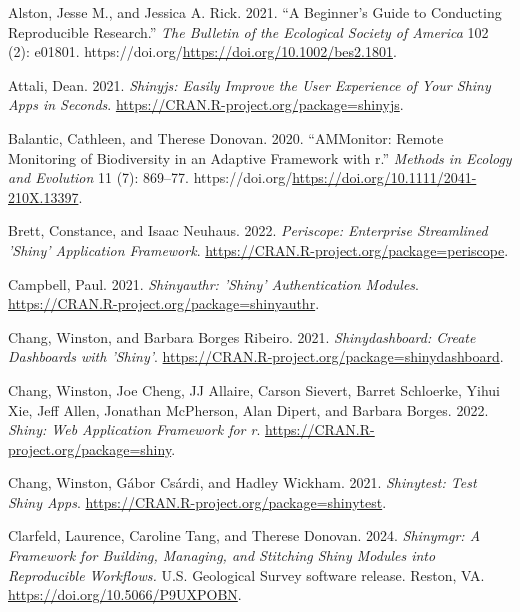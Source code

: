 \hypertarget{refs}{}
\begin{CSLReferences}{1}{0}
\leavevmode{}%
Alston, Jesse M., and Jessica A. Rick. 2021. {``A Beginner's Guide to Conducting Reproducible Research.''} \emph{The Bulletin of the Ecological Society of America} 102 (2): e01801. https://doi.org/\url{https://doi.org/10.1002/bes2.1801}.

\leavevmode{}%
Attali, Dean. 2021. \emph{Shinyjs: Easily Improve the User Experience of Your Shiny Apps in Seconds}. \url{https://CRAN.R-project.org/package=shinyjs}.

\leavevmode{}%
Balantic, Cathleen, and Therese Donovan. 2020. {``AMMonitor: Remote Monitoring of Biodiversity in an Adaptive Framework with r.''} \emph{Methods in Ecology and Evolution} 11 (7): 869--77. https://doi.org/\url{https://doi.org/10.1111/2041-210X.13397}.

\leavevmode{}%
Brett, Constance, and Isaac Neuhaus. 2022. \emph{Periscope: Enterprise Streamlined 'Shiny' Application Framework}. \url{https://CRAN.R-project.org/package=periscope}.

\leavevmode{}%
Campbell, Paul. 2021. \emph{Shinyauthr: 'Shiny' Authentication Modules}. \url{https://CRAN.R-project.org/package=shinyauthr}.

\leavevmode{}%
Chang, Winston, and Barbara Borges Ribeiro. 2021. \emph{Shinydashboard: Create Dashboards with 'Shiny'}. \url{https://CRAN.R-project.org/package=shinydashboard}.

\leavevmode{}%
Chang, Winston, Joe Cheng, JJ Allaire, Carson Sievert, Barret Schloerke, Yihui Xie, Jeff Allen, Jonathan McPherson, Alan Dipert, and Barbara Borges. 2022. \emph{Shiny: Web Application Framework for r}. \url{https://CRAN.R-project.org/package=shiny}.

\leavevmode{}%
Chang, Winston, Gábor Csárdi, and Hadley Wickham. 2021. \emph{Shinytest: Test Shiny Apps}. \url{https://CRAN.R-project.org/package=shinytest}.

\leavevmode{}%
Clarfeld, Laurence, Caroline Tang, and Therese Donovan. 2024. \emph{Shinymgr: A Framework for Building, Managing, and Stitching Shiny Modules into Reproducible Workflows.} U.S. Geological Survey software release. Reston, VA. \url{https://doi.org/10.5066/P9UXPOBN}.


\end{CSLReferences}
